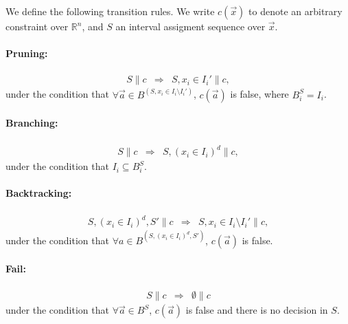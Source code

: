 \documentclass[envcountsect]{llncs}
\begin{document}
\begin{definition} We define the following transition rules.
We write $c(\vec x)$ to denote an arbitrary constraint over $\mathbb{R}^n$, and
$S$ an interval assigment sequence over $\vec x$. 

\paragraph{Pruning:}
\begin{eqnarray*}
S\parallel c &\Longrightarrow& S, x_i\in I_i'\parallel c,
\end{eqnarray*}
under the condition that $\forall \vec a\in B^{(S,x_i\in
I_i\setminus I_i')}$,
$c(\vec a)$ is false, where $B^S_i = I_i$. 
\paragraph{Branching:}
\begin{eqnarray*}
S\parallel c &\Longrightarrow& S, (x_i\in I_i)^d \parallel c,
\end{eqnarray*}
under the condition that $I_i\subseteq B^S_i$.

\paragraph{Backtracking:}
\begin{eqnarray*}
S, (x_i\in I_i)^d, S'\parallel c &\Longrightarrow& S, x_i\in
I_i\setminus I_i'\parallel c, 
\end{eqnarray*}
under the condition that $\forall a\in B^{(S, (x_i\in I_i)^d, S')}$, $c(\vec a)$
is false.

\paragraph{Fail:}
\begin{eqnarray*}
S\parallel c &\Longrightarrow& \emptyset \parallel c 
\end{eqnarray*}
under the condition that $\forall \vec a\in B^S$, $c(\vec a)$ is false and there
is no decision in $S$. 
\end{definition}
\end{document}
